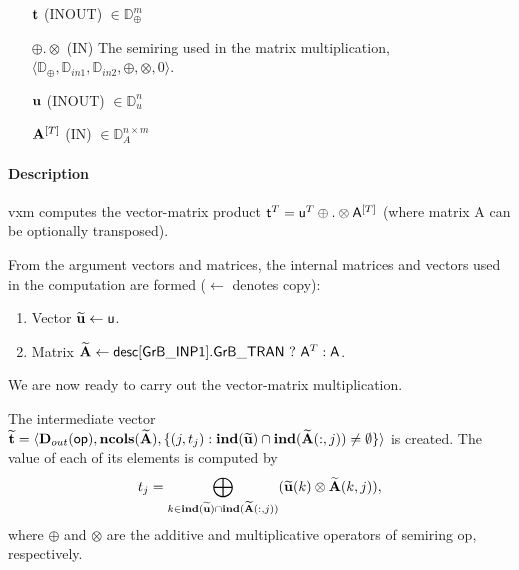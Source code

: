 \begin{itemize}[leftmargin=1.1in]
    \item[${\bf t}$]    ({\sf INOUT}) $\in \mathbb{D}_\oplus^{m}$

    \item[$\oplus.\otimes$]   ({\sf IN}) The semiring used in the matrix
    multiplication, $\langle \mathbb{D}_\oplus, \mathbb{D}_{in1},\mathbb{D}_{in2},\oplus,\otimes,0 \rangle$.

    \item[${\bf u}$]    ({\sf INOUT}) $\in \mathbb{D}_{u}^{n}$

    \item[${\bf A}^{[T]}$]    ({\sf IN}) $\in \mathbb{D}_A^{n\times m}$

\end{itemize}

\paragraph{Description}

{\sf vxm} computes the vector-matrix product ${\sf t}^T = {\sf
u}^T \oplus . \otimes {\sf A}^{[T]}$ (where matrix {\sf A}
 can be optionally transposed).




From the argument vectors and matrices, the internal matrices and vectors used in 
the computation are formed ($\leftarrow$ denotes copy): 
\begin{enumerate}
	\item Vector ${\bf \widetilde{u}} \leftarrow {\sf u}$.

	\item Matrix ${\bf \widetilde{A}} \leftarrow {\sf desc[GrB\_INP1].GrB\_TRAN} \ ? \ {\sf A}^T : {\sf A}$.
\end{enumerate}



We are now ready to carry out the vector-matrix multiplication.

The intermediate vector ${\bf \widetilde{t}} = \langle
\mbox{$\mathbf{D}_{out}$}({\sf op}), \bold{ncols}({\bf \widetilde{A}}),
\{(j,t_j) : \bold{ind}({\bf \widetilde{u}}) \cap
\bold{ind}({\bf \widetilde{A}}(:,j)) \neq \emptyset \} \rangle$
is created.  The value of each of its elements is computed by 
\[t_j = \bigoplus_{k \in \bold{ind}({\bf \widetilde{u}}) \cap
\bold{ind}({\bf \widetilde{A}}(:,j))} ({\bf \widetilde{u}}(k)
\otimes {\bf \widetilde{A}}(k,j)),\] where $\oplus$ and $\otimes$
are the additive and multiplicative operators of semiring {\sf op},
respectively.

